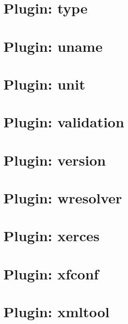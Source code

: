 \let\mypdfximage\pdfximage\def\pdfximage{\immediate\mypdfximage}\documentclass[twoside]{book}
\newcommand{\+}{\discretionary{\mbox{\scriptsize$\hookleftarrow$}}{}{}}
\begin{document}
\chapter{Plugin\+: type}
\label{md_src_plugins_type_README}

\chapter{Plugin\+: uname}
\label{md_src_plugins_uname_README}

\chapter{Plugin\+: unit}
\label{md_src_plugins_unit_README}

\chapter{Plugin\+: validation}
\label{md_src_plugins_validation_README}

\chapter{Plugin\+: version}
\label{md_src_plugins_version_README}

\chapter{Plugin\+: wresolver}
\label{md_src_plugins_wresolver_README}

\chapter{Plugin\+: xerces}
\label{md_src_plugins_xerces_README}

\chapter{Plugin\+: xfconf}
\label{md_src_plugins_xfconf_README}

\chapter{Plugin\+: xmltool}
\label{md_src_plugins_xmltool_README}

\end{document}
